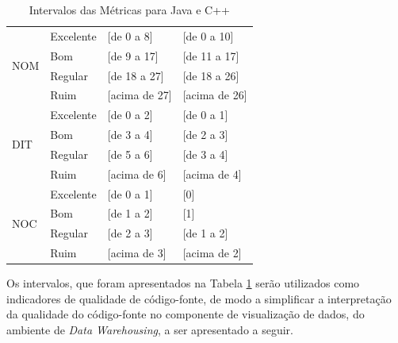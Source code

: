 \begin{table}[!ht]
\begin{center}
\begin{tabular}{ |l|l|l|l| }
		\multirow{4}{*}{NOM} 
		 & Excelente & [de 0 a 8] & [de 0 a 10] \\
		 & Bom & [de 9 a 17] & [de 11 a 17] \\
		 & Regular & [de 18 a 27] & [de 18 a 26] \\
		 & Ruim & [acima de 27] & [acima de 26] \\ \hline
		 
		\multirow{4}{*}{DIT} 
		 & Excelente & [de 0 a 2] & [de 0 a 1] \\
		 & Bom & [de 3 a 4] & [de 2 a 3] \\
		 & Regular & [de 5 a 6] & [de 3 a 4] \\
		 &
		  Ruim & [acima de 6] & [acima de 4] \\ \hline
		
		\multirow{4}{*}{NOC} 
		 & Excelente & [de 0 a 1] & [0] \\
		 & Bom & [de 1 a 2] & [1] \\
		 & Regular & [de 2 a 3] & [de 1 a 2] \\
		 & Ruim & [acima de 3] & [acima de 2] \\ \hline
		 
	\end{tabular}
	\caption{Intervalos das Métricas para Java e C++}
	\label{metrics}
	\end{center}
	\end{table}

\FloatBarrier
	
Os intervalos, que foram apresentados na Tabela \ref{metrics} serão utilizados
como indicadores de qualidade de código-fonte, de modo a simplificar a 
interpretação da qualidade do código-fonte no componente de visualização de dados, do ambiente de \textit{Data Warehousing}, a ser apresentado a seguir.